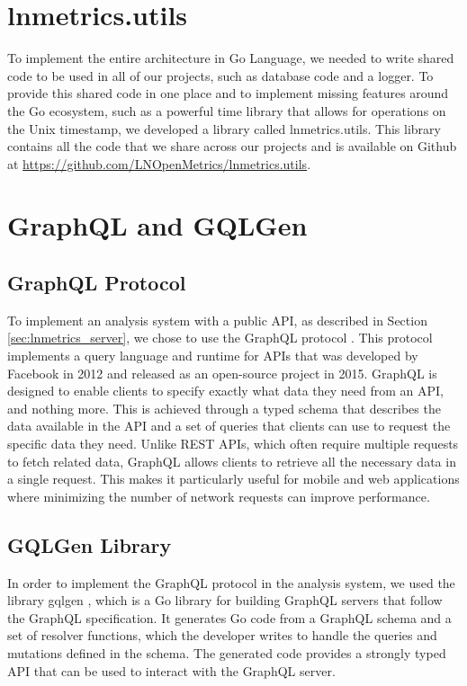 \section{lnmetrics.utils}

To implement the entire architecture in Go Language, we needed to write shared 
code to be used in all of our projects, such as database code and a logger. 
To provide this shared code in one place and to implement missing features 
around the Go ecosystem, such as a powerful time library that allows for 
operations on the Unix timestamp, we developed a library called lnmetrics.utils. 
This library contains all the code that we share across our projects and is 
available on Github at \url{https://github.com/LNOpenMetrics/lnmetrics.utils}.

\section{GraphQL and GQLGen}

\subsection{GraphQL Protocol}

To implement an analysis system with a public API, as  described in 
Section \ref{sec:lnmetrics_server}, we chose to use the GraphQL protocol \cite{graphql}. 
This protocol implements a query language and runtime for APIs that was 
developed by Facebook in 2012 and released as an open-source project in 2015. 
GraphQL is designed to enable clients to specify exactly what data they need 
from an API, and nothing more. This is achieved through a typed schema that 
describes the data available in the API and a set of queries that clients can 
use to request the specific data they need. Unlike REST APIs, which often require 
multiple requests to fetch related data, GraphQL allows clients to retrieve all 
the necessary data in a single request. This makes it particularly useful for 
mobile and web applications where minimizing the number of network 
requests can improve performance.

\subsection{GQLGen Library}

In order to implement the GraphQL protocol \cite{graphql} in the analysis system, we used the library
gqlgen \cite{gqlgen}, which is a Go library for building GraphQL servers that follow the GraphQL specification. 
It generates Go code from a GraphQL schema and a set of resolver functions, which the developer writes
to handle the queries and mutations defined in the schema. The generated code 
provides a strongly typed API that can be used to interact with the GraphQL server.

